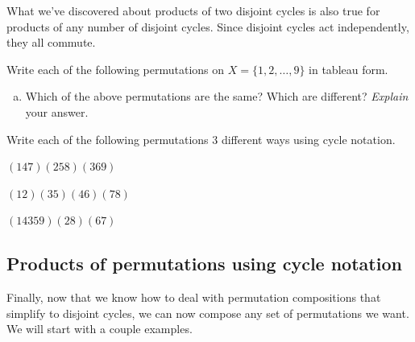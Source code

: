 \noindent
What we've discovered about products of two disjoint cycles is also true for products of any number of disjoint cycles. Since disjoint cycles act independently, they all commute.

\begin{exercise}{}
Write each of the following permutations on $X = \{1,2,\ldots,9\}$ in tableau form.
\begin{enumerate}[(a)]
\item
Which of the above permutations are the same? Which are different? \emph{Explain} your answer.
\end{enumerate}
\end{exercise}

\begin{exercise}{}
Write each of the following permutations 3 different ways using cycle notation.
\begin{enumerate}[(a)]
\begin{multicols}{3}
\item
$(147)(258)(369)$
\item
$(12)(35)(46)(78)$
\item
$(14359)(28)(67)$
\end{multicols}
\end{enumerate}
\end{exercise}


\subsection{Products of permutations using cycle notation}
Finally, now that we know how to deal with permutation compositions that simplify to disjoint cycles, we can now compose any set of permutations we want.  We will start with a couple examples.

